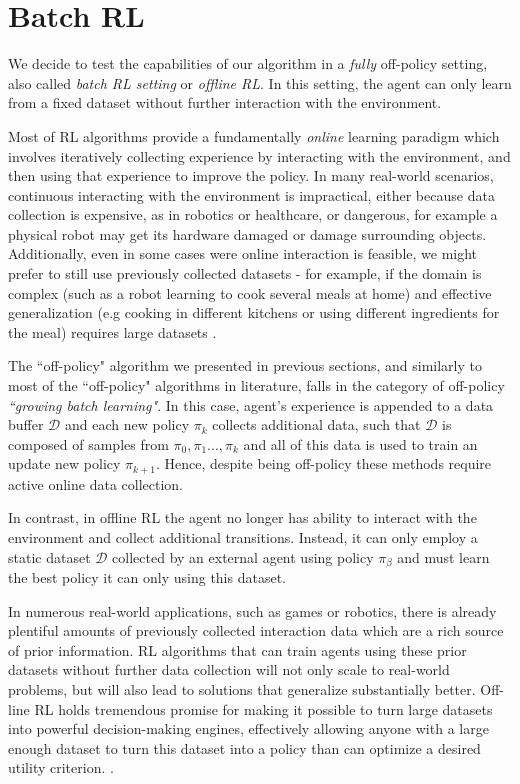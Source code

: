 \chapter{Batch RL}
\label{chapter:batchrl}

We decide to test the capabilities of our algorithm in a \textit{fully} off-policy setting, 
also called \textit{batch RL setting} or \textit{offline RL}. In this setting, the agent 
can only learn from a fixed dataset without further interaction with the environment.

Most of RL algorithms provide a fundamentally \textit{online} learning paradigm which involves
iteratively collecting experience by interacting with the environment, and then
using that experience to improve the policy. 
In many  real-world scenarios, continuous interacting with the environment is impractical, either because 
data collection is expensive, as in robotics or healthcare, or dangerous, for example a physical robot may
get its hardware damaged or damage surrounding objects.
Additionally, even in some cases were online interaction is feasible, we might prefer to still use previously
collected datasets - for example, if the domain is complex (such as a robot learning to cook several meals at home)
and effective generalization (e.g cooking in different kitchens or using different ingredients for the meal)
requires large datasets \cite{levine2020}.


The ``off-policy" algorithm we presented in previous sections, and similarly to most of the ``off-policy"
algorithms in literature, falls in the category of 
off-policy \textit{``growing batch learning"}. In this case, agent's experience is appended to a data buffer 
$\mathcal{D}$ and each new policy $\pi_k$ collects additional data, such that $\mathcal{D}$
is composed of samples from $\pi_0,\pi_1...,\pi_k$ and all of this data is used to train an update new
policy $\pi_{k+1}$. 
Hence, despite being off-policy these methods require active online data collection.

In contrast, in offline RL the agent no longer has ability to interact with the environment and collect
additional transitions. Instead, it
can only employ a static dataset $\mathcal{D}$ collected by an external agent using policy $\pi_\beta$
and must learn the best policy it can only using this dataset.

In numerous real-world applications, such as games or robotics, there is already plentiful amounts 
of previously collected interaction data which are a rich source of prior information.
RL algorithms that can train agents using these prior datasets without further data collection
will not only scale to real-world problems, but will also lead to solutions that generalize substantially better.
Off-line RL holds tremendous promise for making it possible to turn large datasets into powerful 
decision-making engines, effectively allowing anyone with a large enough dataset to turn this dataset
into a policy than can optimize a desired utility criterion. \citep{levine2020}.



